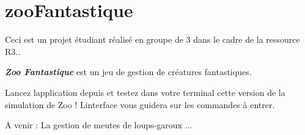 \chapter{zoo\+Fantastique}
\hypertarget{md__r_e_a_d_m_e}{}\label{md__r_e_a_d_m_e}
\label{md__r_e_a_d_m_e_autotoc_md0}%
%
Ceci est un projet étudiant réalisé en groupe de 3 dans le cadre de la ressource R3..

{\itshape {\bfseries{Zoo Fantastique}}} est un jeu de gestion de créatures fantastiques. ~\newline


Lancez l\textquotesingle{}application depuis  et testez dans votre terminal cette version de la simulation de Zoo ! L\textquotesingle{}interface vous guidera sur les commandes à entrer. ~\newline


A venir \+: La gestion de meutes de loups-\/garoux ... 